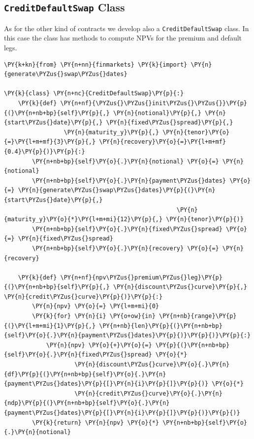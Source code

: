 \subsection{\texttt{CreditDefaultSwap} Class}

As for the other kind of contracts we develop also a \texttt{CreditDefaultSwap} class. In this case the class has methods to compute NPVs for the premium and default legs.

\begin{codebox}
\begin{Verbatim}[commandchars=\\\{\}]
\PY{k+kn}{from} \PY{n+nn}{finmarkets} \PY{k}{import} \PY{n}{generate\PYZus{}swap\PYZus{}dates}
        
\PY{k}{class} \PY{n+nc}{CreditDefaultSwap}\PY{p}{:}
    \PY{k}{def} \PY{n+nf}{\PYZus{}\PYZus{}init\PYZus{}\PYZus{}}\PY{p}{(}\PY{n+nb+bp}{self}\PY{p}{,} \PY{n}{notional}\PY{p}{,} \PY{n}{start\PYZus{}date}\PY{p}{,} \PY{n}{fixed\PYZus{}spread}\PY{p}{,} 
                 \PY{n}{maturity_y}\PY{p}{,} \PY{n}{tenor}\PY{o}{=}\PY{l+m+mf}{3}\PY{p}{,} \PY{n}{recovery}\PY{o}{=}\PY{l+m+mf}{0.4}\PY{p}{)}\PY{p}{:}
        \PY{n+nb+bp}{self}\PY{o}{.}\PY{n}{notional} \PY{o}{=} \PY{n}{notional}
        \PY{n+nb+bp}{self}\PY{o}{.}\PY{n}{payment\PYZus{}dates} \PY{o}{=} \PY{n}{generate\PYZus{}swap\PYZus{}dates}\PY{p}{(}\PY{n}{start\PYZus{}date}\PY{p}{,} 
                                                 \PY{n}{maturity_y}\PY{o}{*}\PY{l+m+mi}{12}\PY{p}{,} \PY{n}{tenor}\PY{p}{)}
        \PY{n+nb+bp}{self}\PY{o}{.}\PY{n}{fixed\PYZus{}spread} \PY{o}{=} \PY{n}{fixed\PYZus{}spread}
        \PY{n+nb+bp}{self}\PY{o}{.}\PY{n}{recovery} \PY{o}{=} \PY{n}{recovery}
    
    \PY{k}{def} \PY{n+nf}{npv\PYZus{}premium\PYZus{}leg}\PY{p}{(}\PY{n+nb+bp}{self}\PY{p}{,} \PY{n}{discount\PYZus{}curve}\PY{p}{,} \PY{n}{credit\PYZus{}curve}\PY{p}{)}\PY{p}{:}
        \PY{n}{npv} \PY{o}{=} \PY{l+m+mi}{0}
        \PY{k}{for} \PY{n}{i} \PY{o+ow}{in} \PY{n+nb}{range}\PY{p}{(}\PY{l+m+mi}{1}\PY{p}{,} \PY{n+nb}{len}\PY{p}{(}\PY{n+nb+bp}{self}\PY{o}{.}\PY{n}{payment\PYZus{}dates}\PY{p}{)}\PY{p}{)}\PY{p}{:}
            \PY{n}{npv} \PY{o}{+}\PY{o}{=} \PY{p}{(}\PY{n+nb+bp}{self}\PY{o}{.}\PY{n}{fixed\PYZus{}spread} \PY{o}{*}
                    \PY{n}{discount\PYZus{}curve}\PY{o}{.}\PY{n}{df}\PY{p}{(}\PY{n+nb+bp}{self}\PY{o}{.}\PY{n}{payment\PYZus{}dates}\PY{p}{[}\PY{n}{i}\PY{p}{]}\PY{p}{)} \PY{o}{*}
                    \PY{n}{credit\PYZus{}curve}\PY{o}{.}\PY{n}{ndp}\PY{p}{(}\PY{n+nb+bp}{self}\PY{o}{.}\PY{n}{payment\PYZus{}dates}\PY{p}{[}\PY{n}{i}\PY{p}{]}\PY{p}{)}\PY{p}{)}
        \PY{k}{return} \PY{n}{npv} \PY{o}{*} \PY{n+nb+bp}{self}\PY{o}{.}\PY{n}{notional}
    

\end{Verbatim}
\end{codebox}
